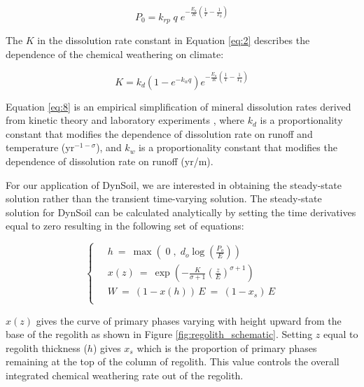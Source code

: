 \documentclass[11pt,letterpaper]{article}
\begin{document}
\begin{equation}
    P_{0} = k_{rp}\;q\;e^{-\frac{E_{a}}{R}\left(\frac{1}{T}-\frac{1}{T_{0}}\right)}
    \label{eq:6}
\end{equation}

The $K$ in the dissolution rate constant in Equation \ref{eq:2} describes the dependence of the chemical weathering on climate:

\begin{equation}
    K = k_{d}\left(1-e^{-k_{w}q}\right)e^{-\frac{E_{a}}{R}\left(\frac{1}{T}-\frac{1}{T_{0}}\right)}
    \label{eq:8}
\end{equation}

\noindent
Equation \ref{eq:8} is an empirical simplification of mineral dissolution rates derived from kinetic theory and laboratory experiments \citep{West2012a}, where $k_{d}$ is a proportionality constant that modifies the dependence of dissolution rate on runoff and temperature (yr$^{-1-\sigma}$), and $k_{w}$ is a proportionality constant that modifies the dependence of dissolution rate on runoff (yr/m).

For our application of DynSoil, we are interested in obtaining the steady-state solution rather than the transient time-varying solution. The steady-state solution for DynSoil can be calculated analytically by setting the time derivatives equal to zero resulting in the following set of equations:

\begin{equation}\label{eq:dynsoil_ss}
\left\{\ 
\begin{aligned}
& h   \ =\    \max\left(  \;  0  \;,\;  d_o \log\left(\frac{P_o}{E}\right)  \right)                                                 \\
& x(z)      \ =\   \exp\left(   - \frac{K}{\sigma+1}  \left(\frac{z}{E}\right)^{\sigma+1}   \right)   \\
& W        \ =\   (1-x(h)) \, E  \ =\   (1-x_s) \, E                                                                         \\
\end{aligned}
\right.
\end{equation}

\noindent
$x(z)$ gives the curve of primary phases varying with height upward from the base of the regolith as shown in Figure \ref{fig:regolith_schematic}. Setting $z$ equal to regolith thickness ($h$) gives $x_s$ which is the proportion of primary phases remaining at the top of the column of regolith. This value controls the overall integrated chemical weathering rate out of the regolith.
\end{document}
